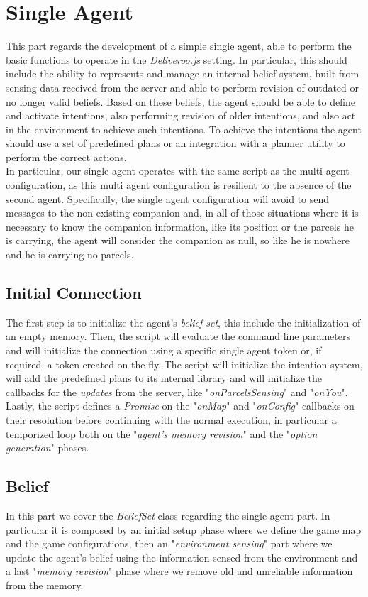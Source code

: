 \section{Single Agent}
    This part regards the development of a simple single agent, able to perform the basic functions to operate in the \textit{Deliveroo.js} setting. In particular, this should include the ability to represents and manage an internal belief system, built from sensing data received from the server and able to perform revision of outdated or no longer valid beliefs. Based on these beliefs, the agent should be able to define and activate  intentions, also performing revision of older intentions, and also act in the environment to achieve such intentions. To achieve the intentions the agent should use a set of predefined plans or an integration with a planner utility to perform the correct actions.
    \medskip\\    
    In particular, our single agent operates with the same script as the multi agent configuration, as this multi agent configuration is resilient to the absence of the second agent. Specifically, the single agent configuration will avoid to send messages to the non existing companion and, in all of those situations where it is necessary to know the companion information, like its position or the parcels he is carrying, the agent will consider the companion as null, so like he is nowhere and he is carrying no parcels.

    \subsection{Initial Connection}
        The first step is to initialize the agent's \textit{belief set}, this include the initialization of an empty memory. Then, the script will evaluate the command line parameters and will initialize the connection using a specific single agent token or, if required, a token created on the fly. The script will initialize the intention system, will add the predefined plans to its internal library and will initialize the callbacks for the \textit{updates} from the server, like "\textit{onParcelsSensing}" and "\textit{onYou}". Lastly, the script defines a \textit{Promise} on the "\textit{onMap}" and "\textit{onConfig}" callbacks on their resolution before continuing with the normal execution, in particular a temporized loop both on the "\textit{agent's memory revision}" and the "\textit{option generation}" phases.

    \subsection{Belief}
        In this part we cover the \textit{BeliefSet} class regarding the single agent part. In particular it is composed by an initial setup phase where we define the game map and the game configurations, then an "\textit{environment sensing}" part where we update the agent's belief using the information sensed from the environment and a last "\textit{memory revision}" phase where we remove old and unreliable information from the memory.

